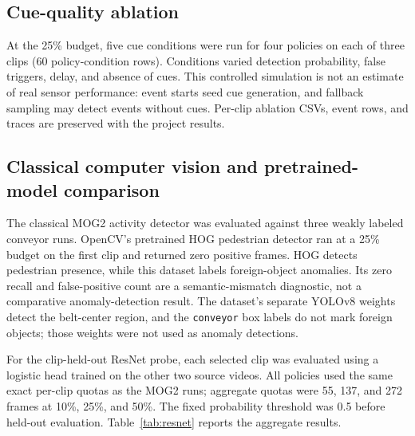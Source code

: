 \documentclass[conference]{IEEEtran}
\begin{document}
\subsection{Cue-quality ablation}
At the 25\% budget, five cue conditions were run for four policies on each of three clips (60 policy-condition rows). Conditions varied detection probability, false triggers, delay, and absence of cues. This controlled simulation is not an estimate of real sensor performance: event starts seed cue generation, and fallback sampling may detect events without cues. Per-clip ablation CSVs, event rows, and traces are preserved with the project results.

\subsection{Classical computer vision and pretrained-model comparison}
The classical MOG2 activity detector was evaluated against three weakly labeled conveyor runs. OpenCV's pretrained HOG pedestrian detector ran at a 25\% budget on the first clip and returned zero positive frames. HOG detects pedestrian presence, while this dataset labels foreign-object anomalies. Its zero recall and false-positive count are a semantic-mismatch diagnostic, not a comparative anomaly-detection result. The dataset's separate YOLOv8 weights detect the belt-center region, and the \texttt{conveyor} box labels do not mark foreign objects; those weights were not used as anomaly detections.

For the clip-held-out ResNet probe, each selected clip was evaluated using a logistic head trained on the other two source videos. All policies used the same exact per-clip quotas as the MOG2 runs; aggregate quotas were 55, 137, and 272 frames at 10\%, 25\%, and 50\%. The fixed probability threshold was 0.5 before held-out evaluation. Table~\ref{tab:resnet} reports the aggregate results.
\end{document}
